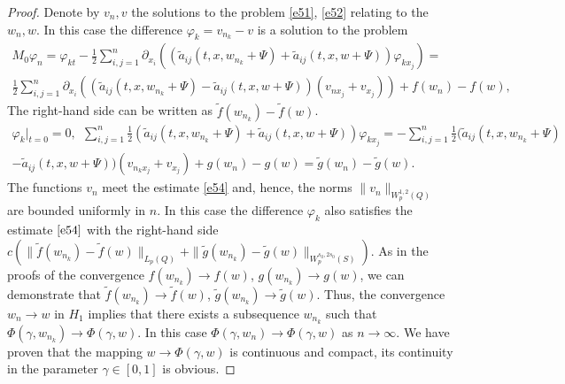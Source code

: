 \documentclass{article}
\theoremstyle{plain}
\begin{document}
\begin{proof}
Denote by  $v_n,v$ the solutions to the problem \eqref{e51}, \eqref{e52} relating to the  $w_n,w$. 
 In this case the difference  $\varphi_{k}=v_{n_k}-v$ is a solution to the problem 
 \begin{multline}\label{e56}
	M_0\varphi_n= \varphi_{kt}-\frac{1}{2}\sum_{i,j=1}^n \partial_{x_i}((\tilde{a}_{ij}(t,x,w_{n_k}+\Psi)+ \tilde{a}_{ij}(t,x,w+\Psi))\varphi_{kx_j})= \\
\frac{1}{2}\sum_{i,j=1}^n \partial_{x_i}((\tilde{a}_{ij}(t,x,w_{n_k}+\Psi) - \tilde{a}_{ij}(t,x,w+\Psi))(v_{nx_j}+v_{x_j})) + f(w_n)-f(w),
\end{multline}
The right-hand side can be written as  $\tilde{f}(w_{n_k})-\tilde{f}(w)$.
\begin{multline}\label{e57}
	\varphi_k|_{t=0}=0,\ \  \sum_{i,j=1}^n  \frac{1}{2} (\tilde{a}_{ij}(t,x,w_{n_k}+\Psi)+ \tilde{a}_{ij}(t,x,w+\Psi)) \varphi_{kx_j}= -  
\sum_{i,j=1}^n  \frac{1}{2} (\tilde{a}_{ij}(t,x,w_{n_k}+\Psi)\\ - \tilde{a}_{ij}(t,x,w+\Psi)) (v_{n_kx_j}+v_{x_j})+ g(w_n)-g(w)=\tilde{g}(w_n)-\tilde{g}(w) .  
\end{multline}
The functions  $v_n$ meet the estimate  \eqref{e54} and, hence, the norms  $\|v_n\|_{W_p^{1,2}(Q)}$ are bounded uniformly in  $n$. 
In this case the difference  $\varphi_k$ also satisfies the estimate  $\eqref{e54}$ with the right-hand side  $c(\|\tilde{f}(w_{n_k})-\tilde{f}(w)\|_{L_p(Q)}+
\|\tilde{g}(w_{n_k})-\tilde{g}(w)\|_{W_p^{s_0,2s_0}(S)})$. As in the proofs of the convergence   $f(w_{n_k})\to f(w)$, $g(w_{n_k})\to g(w)$, we can demonstrate that 
 $\tilde{f}(w_{n_k})\to \tilde{f}(w)$, $\tilde{g}(w_{n_k})\to \tilde{g}(w)$.
Thus, the convergence  $w_n\to w$ in $H_1$ implies that there exists a subsequence  $w_{n_k}$ such that 
$\Phi(\gamma, w_{n_k})\to \Phi(\gamma, w)$. In this case   $\Phi(\gamma, w_{n})\to \Phi(\gamma, w)$ as $n\to \infty.$ 
We have proven that the mapping  $w\to \Phi(\gamma, w)$ is continuous and compact, its continuity in the parameter 
 $\gamma\in [0,1]$ is obvious.
 

\end{proof}
\end{document}
